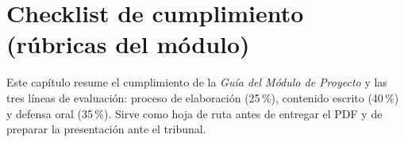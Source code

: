 \chapter{Checklist de cumplimiento (rúbricas del módulo)}
\label{chap:checklist-rubricas}

Este capítulo resume el cumplimiento de la \textit{Guía del Módulo de Proyecto} y las tres líneas de evaluación: proceso de elaboración (25\,\%), contenido escrito (40\,\%) y defensa oral (35\,\%). Sirve como hoja de ruta antes de entregar el PDF y de preparar la presentación ante el tribunal.



\newpage
